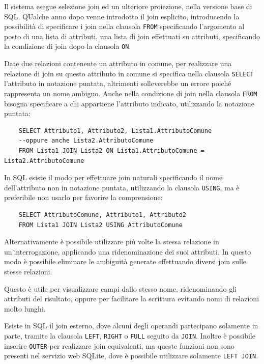 \documentclass{article}
\numberwithin{equation}{subsection}
\begin{document}
Il sistema esegue selezione join ed un ulteriore proiezione, nella versione base di SQL. QUalche anno dopo venne introdotto il join esplicito, 
introducendo la possibilità di specificare i join nella clausola \verb|FROM| specificando l'argomento al posto di una lista di attributi, una lista 
di join effettuati su attributi, specificando la condizione di join dopo la clausola \verb|ON|. 

Date due relazioni contenente un attributo in comune, per realizzare una relazione di join su questo attributo in comune si specifica nella 
clausola \verb|SELECT| l'attributo in notazione puntata, altrimenti solleverebbe un errore poiché rappresenta un nome ambiguo. Anche nella 
condizione di join nella clausola \verb|FROM| bisogna specificare a chi appartiene l'attributo indicato, utilizzando la notazione puntata: 

\begin{verbatim}
    SELECT Attributo1, Attributo2, Lista1.AttributoComune 
    --oppure anche Lista2.AttributoComune
    FROM Lista1 JOIN Lista2 ON Lista1.AttributoComune = Lista2.AttributoComune
\end{verbatim}

In SQL esiste il modo per effettuare join naturali specificando il nome dell'attributo non in notazione puntata, utilizzando la clausola \verb|USING|, 
ma è preferibile non usarlo per favorire la comprensione:

\begin{verbatim}
    SELECT AttributoComune, Attributo1, Attributo2
    FROM Lista1 JOIN Lista2 USING AttributoComune
\end{verbatim}

Alternativamente è possibile utilizzare più volte la stessa relazione in un'interrogazione, applicando una ridenominazione dei suoi attributi. In questo modo è possibile eliminare le ambiguità generate effettuando diversi 
join sulle stesse relazioni. 

Questo è utile per visualizzare campi dallo stesso nome, ridenominando gli attributi del risultato, oppure per facilitare la scrittura 
evitando nomi di relazioni molto lunghi. 

Esiste in SQL il join esterno, dove alcuni degli operandi partecipano solamente in parte, tramite la clausola \verb|LEFT|, \verb|RIGHT| o \verb|FULL| 
seguito da \verb|JOIN|. Inoltre è possibile inserire \verb|OUTER| per realizzare join equivalenti, ma queste funzioni non sono presenti nel servizio web SQLite, dove 
è possibile utilizzare solamente \verb|LEFT JOIN|. 
\end{document}
